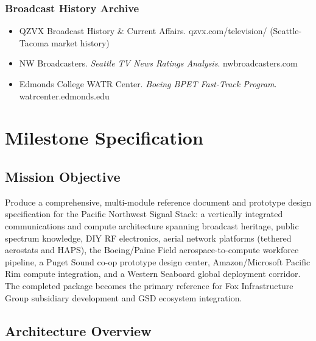 \documentclass[11pt,letterpaper]{article}
\newcommand{\stageheader}[2]{%
  \noindent\colorbox{#2}{\makebox[\textwidth][l]{%
    \textcolor{white}{\bfseries\sffamily\hspace{6pt}#1\hspace{6pt}}}}%
  \vspace{0.5em}\par%
}
\begin{document}
\subsubsection{Broadcast History Archive}
\begin{itemize}
  \item QZVX Broadcast History \& Current Affairs. qzvx.com/television/ (Seattle-Tacoma market history)
  \item NW Broadcasters. \textit{Seattle TV News Ratings Analysis}. nwbroadcasters.com
  \item Edmonds College WATR Center. \textit{Boeing BPET Fast-Track Program}. watrcenter.edmonds.edu
\end{itemize}

\newpage

\stageheader{STAGE 3 --- MISSION PACKAGE}{tertiary}

\section{Milestone Specification}

\subsection{Mission Objective}

Produce a comprehensive, multi-module reference document and prototype design specification for the Pacific Northwest Signal Stack: a vertically integrated communications and compute architecture spanning broadcast heritage, public spectrum knowledge, DIY RF electronics, aerial network platforms (tethered aerostats and HAPS), the Boeing/Paine Field aerospace-to-compute workforce pipeline, a Puget Sound co-op prototype design center, Amazon/Microsoft Pacific Rim compute integration, and a Western Seaboard global deployment corridor. The completed package becomes the primary reference for Fox Infrastructure Group subsidiary development and GSD ecosystem integration.

\subsection{Architecture Overview}
\end{document}
